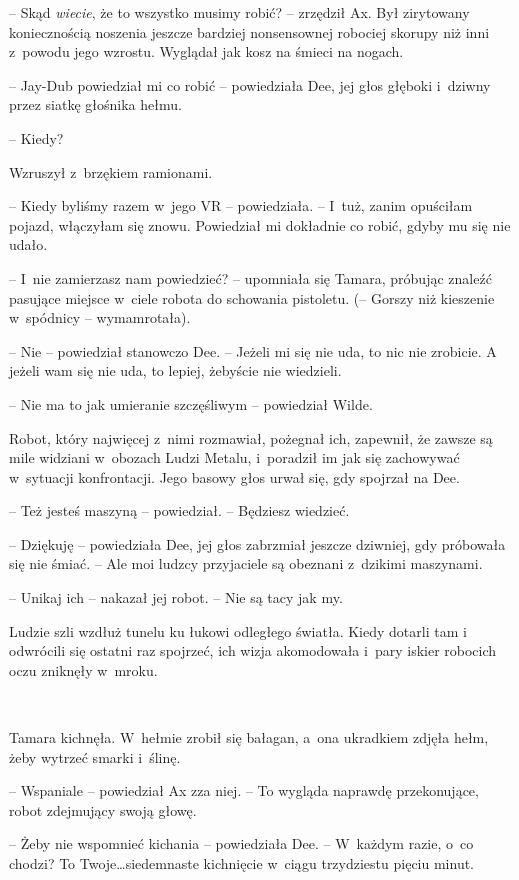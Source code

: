 \documentclass[oneside,polish,11pt,sfheadings]{mwbk}
\begin{document}
-- Skąd \emph{wiecie}, że to wszystko musimy robić? -- zrzędził Ax. Był
zirytowany koniecznością noszenia jeszcze bardziej nonsensownej robociej
skorupy niż inni z~powodu jego wzrostu. Wyglądał jak kosz na śmieci na
nogach.

-- Jay-Dub powiedział mi co robić -- powiedziała Dee, jej głos głęboki i~dziwny przez siatkę głośnika hełmu.

-- Kiedy?

Wzruszył z~brzękiem ramionami. 

-- Kiedy byliśmy razem w~jego VR -- powiedziała. -- I~tuż, zanim opuściłam pojazd, włączyłam się znowu. Powiedział mi dokładnie co robić, gdyby mu się nie udało.

-- I~nie zamierzasz nam powiedzieć? -- upomniała się Tamara, próbując
znaleźć pasujące miejsce w~ciele robota do schowania pistoletu. (--
Gorszy niż kieszenie w~spódnicy -- wymamrotała).

-- Nie -- powiedział stanowczo Dee. -- Jeżeli mi się nie uda, to nic nie
zrobicie. A jeżeli wam się nie uda, to lepiej, żebyście nie wiedzieli.

-- Nie ma to jak umieranie szczęśliwym -- powiedział Wilde.

Robot, który najwięcej z~nimi rozmawiał, pożegnał ich, zapewnił, że
zawsze są mile widziani w~obozach Ludzi Metalu, i~poradził im jak się
zachowywać w~sytuacji konfrontacji. Jego basowy głos urwał się, gdy
spojrzał na Dee.

-- Też jesteś maszyną -- powiedział. -- Będziesz wiedzieć.

-- Dziękuję -- powiedziała Dee, jej głos zabrzmiał jeszcze dziwniej, gdy
próbowała się nie śmiać. -- Ale moi ludzcy przyjaciele są obeznani z~dzikimi maszynami.

-- Unikaj ich -- nakazał jej robot. -- Nie są tacy jak my.

Ludzie szli wzdłuż tunelu ku łukowi odległego światła. Kiedy dotarli tam
i odwrócili się ostatni raz spojrzeć, ich wizja akomodowała i~pary
iskier robocich oczu zniknęły w~mroku.

~

Tamara kichnęła. W~hełmie zrobił się bałagan, a~ona ukradkiem zdjęła
hełm, żeby wytrzeć smarki i~ślinę.

-- Wspaniale -- powiedział Ax zza niej. -- To wygląda naprawdę
przekonujące, robot zdejmujący swoją głowę.

-- Żeby nie wspomnieć kichania -- powiedziała Dee. -- W~każdym razie, o~co
chodzi? To Twoje\ldots siedemnaste kichnięcie w~ciągu trzydziestu pięciu
minut.
\end{document}
